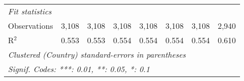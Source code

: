\begin{tabular}{lccccccc}
   \midrule \emph{Fit statistics}\\
   Observations                                                            & 3,108        & 3,108        & 3,108        & 3,108        & 3,108        & 3,108        & 2,940\\  
   R$^2$                                                                   & 0.553        & 0.553        & 0.554        & 0.554        & 0.554        & 0.554        & 0.610\\  
   \midrule
   \multicolumn{8}{l}{\emph{Clustered (Country) standard-errors in parentheses}}\\
   \multicolumn{8}{l}{\emph{Signif. Codes: ***: 0.01, **: 0.05, *: 0.1}}\\
\end{tabular}
\par\endgroup


